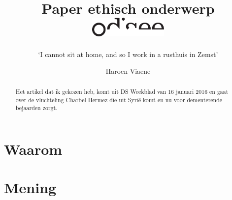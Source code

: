 \documentclass[12pt, a4paper]{paper}
\title{
\vspace{-2cm}
Paper ethisch onderwerp\\
\vspace{-1cm}
\hfill\includegraphics[height=1cm]{logo.pdf}}
\subtitle{`I cannot sit at home, and so I work in a rusthuis in Zemst'
\vspace{-.5cm}}
\author{
\vspace{-1cm}
Haroen Viaene}
\begin{document}
\maketitle

\begin{abstract}

Het artikel dat ik gekozen heb, komt uit DS Weekblad van 16 januari 2016 en gaat over de vluchteling Charbel Hermez die uit Syrië komt en nu voor dementerende bejaarden zorgt.

\Blindtext[2]

\end{abstract}

\section{Waarom}

\Blindtext[3]

\section{Mening}

\Blindtext[3]
\end{document}
